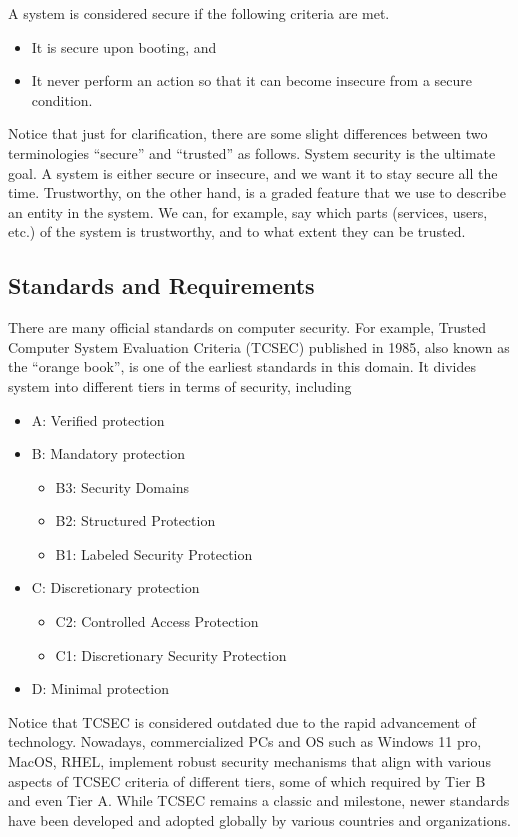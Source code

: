 A system is considered secure if the following criteria are met.
\begin{itemize}
	\item It is secure upon booting, and
	\item It never perform an action so that it can become insecure from a secure condition.
\end{itemize}
Notice that just for clarification, there are some slight differences between two terminologies ``secure'' and ``trusted'' as follows. System security is the ultimate goal. A system is either secure or insecure, and we want it to stay secure all the time. Trustworthy, on the other hand, is a graded feature that we use to describe an entity in the system. We can, for example, say which parts (services, users, etc.) of the system is trustworthy, and to what extent they can be trusted.

\subsection{Standards and Requirements}

There are many official standards on computer security. For example, Trusted Computer System Evaluation Criteria (TCSEC) published in 1985, also known as the ``orange book'', is one of the earliest standards in this domain. It divides system into different tiers in terms of security, including
\begin{itemize}
	\item A: Verified protection
	\item B: Mandatory protection
	\begin{itemize}
		\item B3: Security Domains
		\item B2: Structured Protection
		\item B1: Labeled Security Protection
	\end{itemize}
	\item C: Discretionary protection
	\begin{itemize}
		\item C2: Controlled Access Protection
		\item C1: Discretionary Security Protection
	\end{itemize}
	\item D: Minimal protection
\end{itemize}
Notice that TCSEC is considered outdated due to the rapid advancement of technology. Nowadays, commercialized PCs and OS such as Windows 11 pro, MacOS, RHEL, implement robust security mechanisms that align with various aspects of TCSEC criteria of different tiers, some of which required by Tier B and even Tier A. While TCSEC remains a classic and milestone, newer standards have been developed and adopted globally by various countries and organizations.

